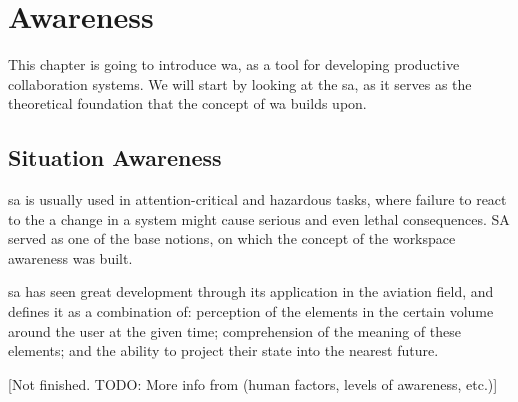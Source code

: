 
\chapter{Awareness}

This chapter is going to introduce \gls{wa}, as a tool for developing productive collaboration systems. We will start by looking at the \gls{sa}, as it serves as the theoretical foundation that the concept of \gls{wa} builds upon.




\section{Situation Awareness}

\gls{sa} is usually used in attention-critical and hazardous tasks, where failure to react to the a change in a system might cause serious and even lethal consequences. SA served as one of the base notions, on which the concept of the workspace awareness was built.

\gls{sa} has seen great development through its application in the aviation field, and \cite{endsley_situation_1988} defines it as a combination of: perception of the elements in the certain volume around the user at the given time; comprehension of the meaning of these elements; and the ability to project their state into the nearest future.

[Not finished. TODO: More info from \cite{endsley_situation_1988} (human factors, levels of awareness, etc.)]


